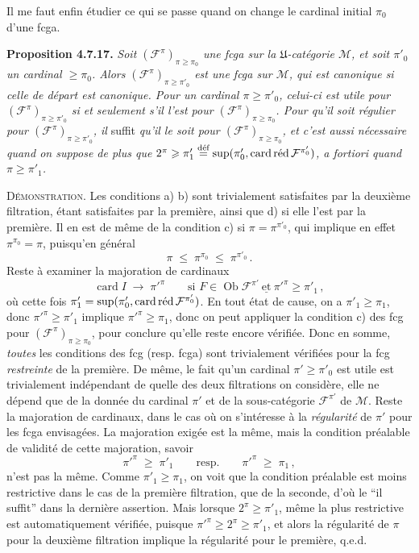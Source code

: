 \documentclass[11pt]{article}
\newcommand{\msp}[1]{\marginpar{\footnotesize [#1]}}
\newcommand{\card}{\operatorname{card}}
\newcommand{\Ob}{\operatorname{Ob}}
\newcommand{\cardred}{\mathop{\mathrm{card}\,\textup{réd}}\nolimits}
\begin{document}
\noindent\msp{page 182}Il me faut enfin étudier ce qui se passe quand on change le cardinal initial $\pi_0$ d'une fcga.

\textbf{Proposition 4.7.17.} \textit{Soit $(\mathcal{F}^{\pi})_{\pi\geqslant\pi_0}$ une fcga sur la $\mathfrak{U}$-catégorie $\mathcal{M}$, et soit $\pi'_0$ un cardinal $\geqslant\pi_0$. Alors $(\mathcal{F}^{\pi})_{\pi\geqslant\pi'_0}$ est une fcga sur $\mathcal{M}$, qui est canonique si celle de départ est canonique. Pour un cardinal $\pi\geqslant\pi'_0$, celui-ci est utile pour $(\mathcal{F}^{\pi})_{\pi\geqslant\pi'_0}$ si et seulement s'il l'est pour $(\mathcal{F}^{\pi})_{\pi\geqslant\pi_0}$. Pour qu'il soit régulier pour $(\mathcal{F}^{\pi})_{\pi\geqslant\pi'_0}$, il} suffit \textit{qu'il le soit pour $(\mathcal{F}^{\pi})_{\pi\geqslant\pi_0}$, et c'est aussi nécessaire quand on suppose de plus que $2^{\pi}\geqslant\pi'_1\overset{\text{déf}}{=}\sup(\pi'_0,\cardred\mathcal{F}^{\pi'_0})$, a fortiori quand $\pi\geqslant\pi'_1$.}

\textsc{Démonstration}. Les conditions a) b) sont trivialement satisfaites par la deuxième filtration, étant satisfaites par la première, ainsi que d) si elle l'est par la première. Il en est de même de la condition c) si $\pi=\pi^{\pi'_0}$, qui implique en effet $\pi^{\pi_0}=\pi$, puisqu'en général
\[
\pi \;\leqslant\; \pi^{\pi_0} \;\leqslant\; \pi^{\pi'_0} \, .
\]
Reste à examiner la majoration de cardinaux
\[
\card I \;\longrightarrow\; \pi'^{\pi} \qquad \text{si } F\in\Ob\mathcal{F}^{\pi'} \ \underline{\text{et}}\ \pi'^{\pi}\geqslant\pi'_1 \, , %
\]
où cette fois $\pi'_1=\sup(\pi'_0,\cardred\mathcal{F}^{\pi'_0})$. En tout état de cause, on a $\pi'_1\geqslant\pi_1$, donc
\msp{page 183}
$\pi'^{\pi}\geqslant\pi'_1$ implique $\pi'^{\pi}\geqslant\pi_1$, donc on peut appliquer la condition c) des fcg pour $(\mathcal{F}^{\pi})_{\pi\geqslant\pi_0}$, pour conclure qu'elle reste encore vérifiée. Donc en somme, \textit{toutes} les conditions des fcg (resp. fcga) sont trivialement vérifiées pour la fcg \textit{restreinte} de la première. De même, le fait qu'un cardinal $\pi'\geqslant\pi'_0$ est utile est trivialement indépendant de quelle des deux filtrations on considère, elle ne dépend que de la donnée du cardinal $\pi'$ et de la sous-catégorie $\mathcal{F}^{\pi'}$ de $\mathcal{M}$. Reste la majoration de cardinaux, dans le cas où on s'intéresse à la \textit{régularité} de $\pi'$ pour les fcga envisagées. La majoration exigée est la même, mais la condition préalable de validité de cette majoration, savoir
\[
\pi'^{\pi} \;\geqslant\; \pi'_1 \qquad \text{resp.} \qquad \pi'^{\pi} \;\geqslant\; \pi_1 \, ,
\]
n'est pas la même. Comme $\pi'_1\geqslant\pi_1$, on voit que la condition préalable est moins restrictive dans le cas de la première filtration, que de la seconde, d'où le ``il suffit'' dans la dernière assertion. Mais lorsque $2^{\pi}\geqslant\pi'_1$, même la plus restrictive est automatique\msp{page 184}ment vérifiée, puisque $\pi'^{\pi}\geqslant 2^{\pi}\geqslant\pi'_1$, et alors la régularité de $\pi$ pour la deuxième filtration implique la régularité pour le première, q.e.d. %
\end{document}
